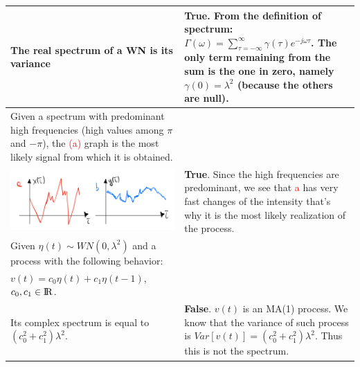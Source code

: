 \documentclass[10pt,a4paper]{article}
\begin{document}
\begin{center}
\begin{tabular}{ | m{200pt} | m{200pt}| }
\\ \hline
The real spectrum of a WN is its variance & \textbf{True}. From the definition of spectrum: $\Gamma(\omega)=\sum_{\tau=-\infty}^{\infty} \gamma(\tau)e^{-j \omega \tau}$. The only term remaining from the sum is the one in zero, namely $\gamma(0)=\lambda^2$ (because the others are null).
\\ \hline
Given a spectrum with predominant high frequencies (high values among $\pi$ and $-\pi$), the \textcolor{red}{(a)} graph is the most likely signal from which it is obtained. \\
\begin{minipage}{.4\textwidth}
      \includegraphics[width=\linewidth]{images/spectrum-graph.png}
    \end{minipage}
      & \textbf{True}. Since the high frequencies are predominant, we see that \textcolor{red}{a} has very fast changes of the intensity that's why it is the most likely realization of the process.
      \\ \hline
      Given $\eta(t) \sim WN(0,\lambda^2)$ and a process with the following behavior: \\ $v(t)=c_0\eta(t)+c_1\eta(t-1)$, $c_0,c_1 \in {\rm I\!R}$. \\
      Its complex spectrum is equal to $(c_0^2+c_1^2)\lambda^2$.
      & \textbf{False}. $v(t)$ is an MA(1) process. We know that the variance of such process is $Var[v(t)]=(c_0^2+c_1^2)\lambda^2$. Thus this is not the spectrum.
      \\ \hline
     
\end{tabular}
\end{center}
\end{document}
